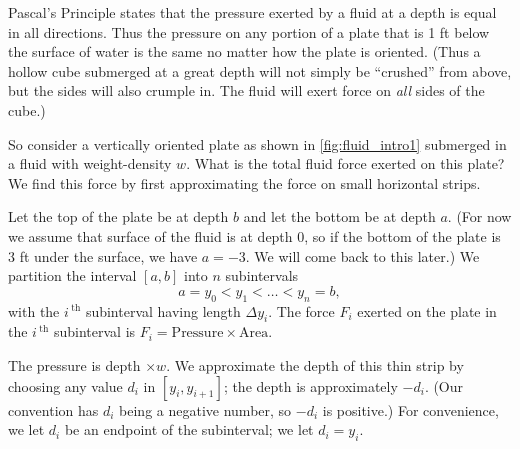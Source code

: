 Pascal's Principle states  that the pressure exerted by a fluid at a depth is equal in all directions. Thus the pressure on any portion of a plate that is 1 ft below the surface of water is the same no matter how the plate is oriented. (Thus a hollow cube submerged at a great depth will not simply be ``crushed'' from above, but the sides will also crumple in. The fluid will exert force on \emph{all} sides of the cube.)


So consider a vertically oriented plate as shown in \autoref{fig:fluid_intro1} submerged in a fluid with weight-density $w$. What is the total fluid force exerted on this plate? We find this force by first approximating the force on small horizontal strips.

Let the top of the plate be at depth $b$ and let the bottom be at depth $a$. (For now we assume that surface of the fluid is at depth 0, so if the bottom of the plate is 3 ft under the surface, we have $a=-3$. We will come back to this later.) We partition the interval $[a,b]$ into $n$ subintervals 
\[a=y_0<y_1<\dotso<y_n=b,\]
with the $i\,^\text{th}$ subinterval having length $\Delta y_i$. The force $F_i$ exerted on the plate in the $i\,^\text{th}$ subinterval is $F_i = \text{Pressure}\times \text{Area}.$

The pressure is depth $\times w$. We approximate the depth of this thin strip by choosing any value $d_i$ in $[y_i,y_{i+1}]$; the depth is approximately $-d_i$. (Our convention has $d_i$ being a negative number, so $-d_i$ is positive.) For convenience, we let $d_i$ be an endpoint of the subinterval; we let $d_i = y_i$. 

